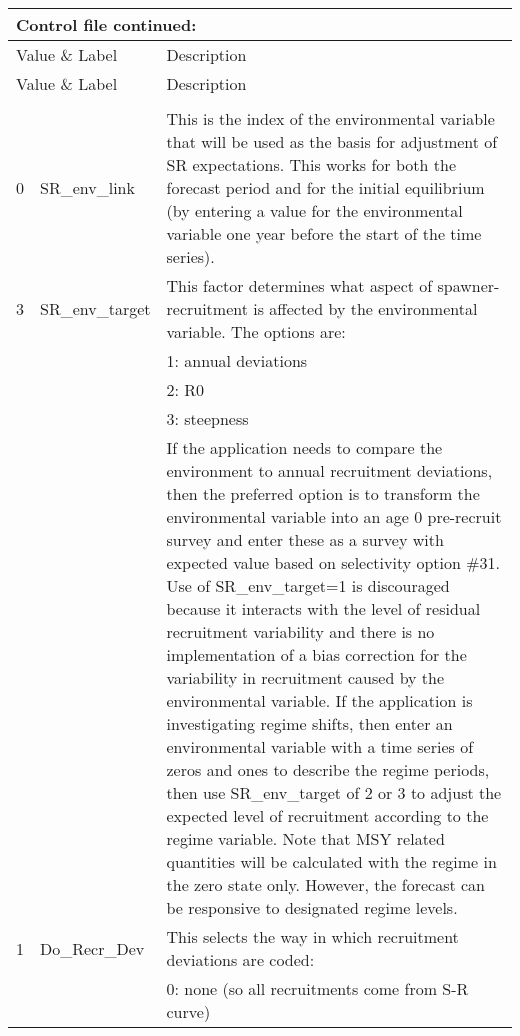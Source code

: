 \begin{center}
\begin{longtable}{p{1cm} p{3cm} p{11cm}}
	\multicolumn{3}{l}{Control file continued:}\\
	\hline
	\multicolumn{2}{l}{Value \& Label} &  Description\\
	\hline
	\endfirsthead
	
	\hline
	\multicolumn{2}{l}{Value \& Label} &  Description\\
	\hline
	\endhead
	
	\endfoot
	\endlastfoot
		\multicolumn{3}{l}{Then read additional spawner-recruitment conditions:}\\
		\hline
		0 & SR\_env\_link & This is the index of the environmental variable that will be used as the basis for adjustment of SR expectations.  This works for both the forecast period and for the initial equilibrium (by entering a value for the environmental variable one year before the start of the time series).\\
		\hline
		3 & SR\_env\_target & This factor determines what aspect of spawner-recruitment is affected by the environmental variable.  The options are:\\
		& & 1: annual deviations\\
		& & 2: R0 \\
		& & 3: steepness\\
		& & If the application needs to compare the environment to annual recruitment deviations, then the preferred option is to transform the environmental variable into an age 0 pre-recruit survey and enter these as a survey with expected value based on selectivity option \#31.  Use of SR\_env\_target=1 is discouraged because it interacts with the level of residual recruitment variability and there is no implementation of a bias correction for the variability in recruitment caused by the environmental variable.  If the application is investigating regime shifts, then enter an environmental variable with a time series of zeros and ones to describe the regime periods, then use SR\_env\_target of 2 or 3 to adjust the expected level of recruitment according to the regime variable.  Note that MSY related quantities will be calculated with the regime in the zero state only.  However, the forecast can be responsive to designated regime levels.\\
		\hline
		1 & Do\_Recr\_Dev & This selects the way in which recruitment deviations are coded:\\
		  &  & 0:  none (so all recruitments come from S-R curve)\\

\end{longtable}
\end{center}
